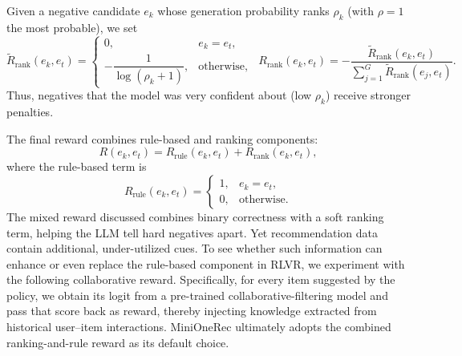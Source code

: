 Given a negative candidate $e_k$ whose generation probability ranks $\rho_k$ (with $\rho=1$ the most probable), we set
\[
\tilde{R}_{\text{rank}}(e_k,e_t)=
\begin{cases}
0, & e_k=e_t,\\
-\dfrac{1}{\log(\rho_k+1)}, & \text{otherwise},
\end{cases}\;\;
R_{\text{rank}}(e_k,e_t)=
-\dfrac{\tilde{R}_{\text{rank}}(e_k,e_t)}
{\sum_{j=1}^{G}\tilde{R}_{\text{rank}}(e_j,e_t)}.
\]
Thus, negatives that the model was very confident about (low $\rho_k$) receive stronger penalties.

The final reward combines rule-based and ranking components:
\[
R(e_k,e_t)=R_{\text{rule}}(e_k,e_t)+R_{\text{rank}}(e_k,e_t),
\]
where the rule-based term is
\[
R_{\text{rule}}(e_k,e_t)=
\begin{cases}
1, & e_k = e_t,\\
0, & \text{otherwise}.
\end{cases}
\]
The mixed reward discussed combines binary correctness with a soft ranking term, helping the LLM tell hard negatives apart. Yet recommendation data contain additional, under-utilized cues. To see whether such information can enhance or even replace the rule-based component in RLVR, we experiment with the following collaborative reward. Specifically, for every item suggested by the policy, we obtain its logit from a pre-trained collaborative-filtering model and pass that score back as reward, thereby injecting knowledge extracted from historical user–item interactions. MiniOneRec ultimately adopts the combined ranking-and-rule reward as its default choice.



